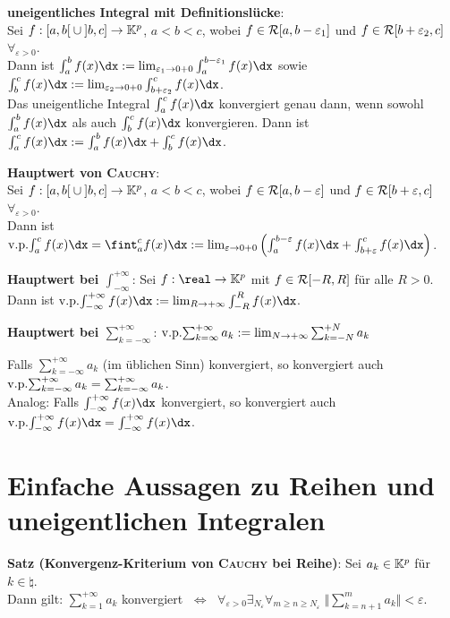 \linie

\textbf{uneigentliches Integral mit Definitionslücke}: \\
Sei $f: \left[a,b\right[ \cup \left]b,c\right] \rightarrow \mathbb{K}^p$,
$a < b < c$, wobei $f \in \mathcal{R}[a, b - \varepsilon_1]$ und
$f \in \mathcal{R}[b + \varepsilon_2, c]$ $\forall_{\varepsilon > 0}$. \\
Dann ist $\int_a^b f(x)\dx :=
\lim_{\varepsilon_1 \to 0+0} \int_a^{b-\varepsilon_1} f(x)\dx$ sowie
$\int_b^c f(x)\dx :=
\lim_{\varepsilon_2 \to 0+0} \int_{b+\varepsilon_2}^c f(x)\dx$. \\
Das uneigentliche Integral $\int_a^c f(x)\dx$ konvergiert genau dann, wenn
sowohl $\int_a^b f(x)\dx$ als auch $\int_b^c f(x)\dx$
konvergieren.
Dann ist $\int_a^c f(x)\dx := \int_a^b f(x)\dx + \int_b^c f(x)\dx$.

\linie

\textbf{Hauptwert von \textsc{Cauchy}}: \\
Sei $f: \left[a,b\right[ \cup \left]b,c\right] \rightarrow \mathbb{K}^p$,
$a < b < c$, wobei $f \in \mathcal{R}[a, b - \varepsilon]$ und
$f \in \mathcal{R}[b + \varepsilon, c]$ $\forall_{\varepsilon > 0}$. \\
Dann ist $\vp\int_a^c f(x)\dx = \fint_a^c f(x)\dx :=
\lim_{\varepsilon \to 0+0} \left(\int_a^{b-\varepsilon} f(x)\dx +
\int_{b+\varepsilon}^c f(x)\dx\right)$.

\textbf{Hauptwert bei $\int_{-\infty}^{+\infty}$}:
Sei $f: \real \rightarrow \field^p$ mit $f \in \mathcal{R}[-R, R]$ für alle
$R > 0$. \\
Dann ist $\vp\int_{-\infty}^{+\infty} f(x)\dx :=
\lim_{R \to +\infty} \int_{-R}^R f(x)\dx$.

\textbf{Hauptwert bei $\sum_{k=-\infty}^{+\infty}$}:
$\operatorname{v.\!p.\!}\sum_{k=\infty}^{+\infty} a_k := \lim_{N \to +\infty} \sum_{k=-N}^{+N} a_k$

Falls $\sum_{k=-\infty}^{+\infty} a_k$ (im üblichen Sinn) konvergiert,
so konvergiert auch
$\operatorname{v.\!p.\!}\sum_{k=-\infty}^{+\infty} a_k = \sum_{k=-\infty}^{+\infty} a_k$. \\
Analog:
Falls $\int_{-\infty}^{+\infty} f(x)\dx$ konvergiert,
so konvergiert auch
$\vp\int_{-\infty}^{+\infty} f(x)\dx = \int_{-\infty}^{+\infty} f(x)\dx$.

\section{%
    Einfache Aussagen zu Reihen und uneigentlichen Integralen%
}

\textbf{Satz (Konvergenz-Kriterium von \textsc{Cauchy} bei Reihe)}:
Sei $a_k \in \mathbb{K}^p$ für $k \in \natural$. \\
Dann gilt:
$\sum_{k=1}^{+\infty} a_k$ konvergiert $\;\Leftrightarrow\;$
$\forall_{\varepsilon > 0} \exists_{N_\varepsilon}
\forall_{m \ge n \ge N_\varepsilon}\;
\big\Vert \sum_{k=n+1}^m a_k \big\Vert < \varepsilon$.

